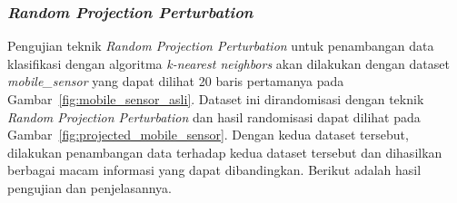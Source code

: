 \subsubsection{\textit{Random Projection Perturbation}}
\label{subsubsec:pengujian-klasifikasi-rpp}

Pengujian teknik \textit{Random Projection Perturbation} untuk penambangan data klasifikasi dengan algoritma \textit{k-nearest neighbors} akan dilakukan dengan dataset \textit{mobile\_sensor} yang dapat dilihat 20 baris pertamanya pada Gambar~\ref{fig:mobile_sensor_asli}. Dataset ini dirandomisasi dengan teknik \textit{Random Projection Perturbation} dan hasil randomisasi dapat dilihat pada Gambar~\ref{fig:projected_mobile_sensor}. Dengan kedua dataset tersebut, dilakukan penambangan data terhadap kedua dataset tersebut dan dihasilkan berbagai macam informasi yang dapat dibandingkan. Berikut adalah hasil pengujian dan penjelasannya.

